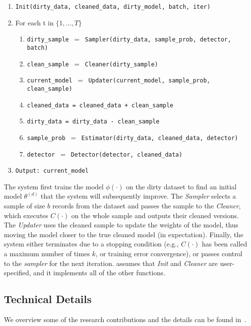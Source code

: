   \begin{enumerate}[leftmargin=1em]\scriptsize\sloppy
  \item \texttt{Init(dirty\_data, cleaned\_data, dirty\_model, batch, iter)}
  \item For each t in $\{1,...,T\}$
  \begin{enumerate}
    \item \texttt{dirty\_sample $=$ Sampler(dirty\_data, sample\_prob, detector, batch)}
    \item \texttt{clean\_sample $=$ Cleaner(dirty\_sample)}
    \item \texttt{current\_model $=$ Updater(current\_model, sample\_prob, clean\_sample)}
    \item \texttt{cleaned\_data = cleaned\_data + clean\_sample}
    \item \texttt{dirty\_data = dirty\_data - clean\_sample}
    \item \texttt{sample\_prob $=$ Estimator(dirty\_data, cleaned\_data, detector)}
    \item \texttt{detector $=$ Detector(detector, cleaned\_data)}
  \end{enumerate}
  \item \texttt{Output: current\_model}
  \end{enumerate}

The system first trains the model $\phi(\cdot)$ on the dirty dataset to find an initial model $\theta^{(d)}$ that the system will subsequently improve.
The {\it Sampler} selects a sample of size $b$ records from the dataset and passes
the sample to the {\it Cleaner}, which executes $C(\cdot)$ on the whole sample and outputs their cleaned versions.
The \emph{Updater} uses the cleaned sample to update the weights of the model, thus moving the model closer to the true cleaned model (in expectation).
Finally, the system either terminates due to a stopping condition (e.g., $C(\cdot)$ has been called a maximum number of times $k$, or training error convergence),
or passes control to the {\it sampler} for the next iteration.
\sys assumes that {\it Init} and {\it Cleaner} are user-specified, and it implements all of the other functions.

\subsection{Technical Details}
We overview some of the research contributions and the details can be found in~\cite{activecleanarxiv}.

  \vspace{0.5em}

